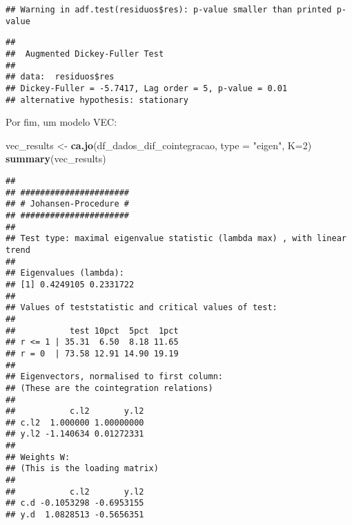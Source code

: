 \documentclass[
]{article}
\newenvironment{Shaded}{\begin{snugshade}}{\end{snugshade}}
\newcommand{\AttributeTok}[1]{\textcolor[rgb]{0.13,0.29,0.53}{#1}}
\newcommand{\DecValTok}[1]{\textcolor[rgb]{0.00,0.00,0.81}{#1}}
\newcommand{\FunctionTok}[1]{\textcolor[rgb]{0.13,0.29,0.53}{\textbf{#1}}}
\newcommand{\NormalTok}[1]{#1}
\newcommand{\OtherTok}[1]{\textcolor[rgb]{0.56,0.35,0.01}{#1}}
\newcommand{\StringTok}[1]{\textcolor[rgb]{0.31,0.60,0.02}{#1}}
\begin{document}
\begin{verbatim}
## Warning in adf.test(residuos$res): p-value smaller than printed p-value
\end{verbatim}

\begin{verbatim}
## 
##  Augmented Dickey-Fuller Test
## 
## data:  residuos$res
## Dickey-Fuller = -5.7417, Lag order = 5, p-value = 0.01
## alternative hypothesis: stationary
\end{verbatim}

Por fim, um modelo VEC:

\begin{Shaded}
\begin{Highlighting}[]
\NormalTok{vec\_results }\OtherTok{\textless{}{-}} \FunctionTok{ca.jo}\NormalTok{(df\_dados\_dif\_cointegracao, }\AttributeTok{type =} \StringTok{"eigen"}\NormalTok{, }\AttributeTok{K=}\DecValTok{2}\NormalTok{)}
\FunctionTok{summary}\NormalTok{(vec\_results)}
\end{Highlighting}
\end{Shaded}

\begin{verbatim}
## 
## ###################### 
## # Johansen-Procedure # 
## ###################### 
## 
## Test type: maximal eigenvalue statistic (lambda max) , with linear trend 
## 
## Eigenvalues (lambda):
## [1] 0.4249105 0.2331722
## 
## Values of teststatistic and critical values of test:
## 
##           test 10pct  5pct  1pct
## r <= 1 | 35.31  6.50  8.18 11.65
## r = 0  | 73.58 12.91 14.90 19.19
## 
## Eigenvectors, normalised to first column:
## (These are the cointegration relations)
## 
##           c.l2       y.l2
## c.l2  1.000000 1.00000000
## y.l2 -1.140634 0.01272331
## 
## Weights W:
## (This is the loading matrix)
## 
##           c.l2       y.l2
## c.d -0.1053298 -0.6953155
## y.d  1.0828513 -0.5656351
\end{verbatim}
\end{document}
